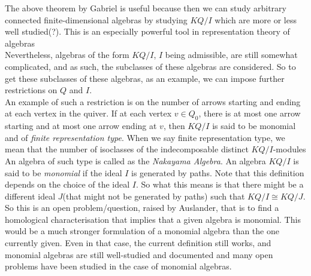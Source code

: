 \documentclass{amsart}
\numberwithin{figure}{section}
\begin{document}
 
 The above theorem by Gabriel is useful because then we can study arbitrary connected finite-dimensional algebras by studying $KQ/I$ which are more or less well studied(?). This is an especially powerful tool in representation theory of algebras \\

 Nevertheless, algebras of the form $KQ/I$, $I$ being admissible, are still somewhat complicated, and as such, the subclasses of these algebras are considered. So to get these subclasses of these algebras, as an example, we can impose further restrictions on $Q$ and $I$. \\

 An example of such a restriction is on the number of arrows starting and ending at each vertex in the quiver. If at each vertex $v\in Q_0$, there is at most one arrow starting and at most one arrow ending at $v$, then $KQ/I$ is said to be monomial and of \textit{finite representation type}. When we say finite representation type, we mean that the number of isoclasses of the indecomposable distinct $KQ/I$-modules
 An algebra of such type is called as the \textit{Nakayama Algebra}. An algebra $KQ/I$
  is said to be \textit{monomial} if the ideal $I$ is generated by paths. Note that this definition depends on the choice of the ideal $I$. So what this means is that there might be a different ideal $J$(that might not be generated by paths) such that $KQ/I\cong KQ/J$. So this is an open problem/question, raised by Auslander, that is to find a homological characterisation that implies that a given algebra is monomial. This would be a much stronger formulation of a monomial algebra than the one currently given. Even in that case, the current definition still works, and monomial algebras are still well-studied and documented and many open problems have been studied in the case of monomial algebras.\\
  
\end{document}
